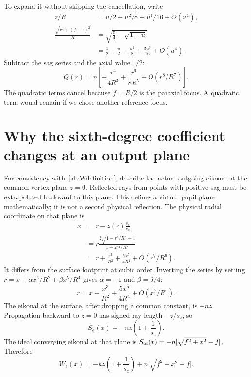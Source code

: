 To expand it without skipping the cancellation, write
\begin{align}
 z/R&=u/2+u^2/8+u^3/16+O(u^4),\\
 \frac{\sqrt{r^2+(f-z)^2}}{R}
 &=\sqrt{\frac54-\sqrt{1-u}}\\
 &=\frac12+\frac u2-\frac{u^2}{8}
                   +\frac{3u^3}{16}+O(u^4).
\end{align}
Subtract the sag series and the axial value $1/2$:
\begin{equation}
 \boxed{Q(r)=n\left[-\frac{r^4}{4R^3}
                    +\frac{r^6}{8R^5}+O(r^8/R^7)\right].}
 \label{ab:Qseries}
\end{equation}
The quadratic terms cancel because $f=R/2$ is the paraxial focus. A quadratic
term would remain if we chose another reference focus.

\section{Why the sixth-degree coefficient changes at an output plane}
For consistency with~\eqref{ab:Wdefinition}, describe the actual outgoing
eikonal at the common vertex plane $z=0$. Reflected rays from points with
positive sag must be extrapolated backward to this plane. This defines a
virtual pupil plane mathematically; it is not a second physical reflection.
The physical radial coordinate on that plane is
\begin{align}
 x&=r-z(r)\frac{s_r}{s_z}\\
  &=r\frac{2\sqrt{1-r^2/R^2}-1}{1-2r^2/R^2}\\
  &=r+\frac{r^3}{R^2}+\frac{7r^5}{4R^4}+O(r^7/R^6).
 \label{ab:spherepupilmap}
\end{align}
It differs from the surface footprint at cubic order. Inverting the series
by setting $r=x+\alpha x^3/R^2+\beta x^5/R^4$ gives
$\alpha=-1$ and $\beta=5/4$:
\begin{equation}
 r=x-\frac{x^3}{R^2}+\frac{5x^5}{4R^4}+O(x^7/R^6).
\end{equation}
The eikonal at the surface, after dropping a common constant, is $-nz$.
Propagation backward to $z=0$ has signed ray length $-z/s_z$, so
\begin{equation}
 S_e(x)=-nz\left(1+\frac{1}{s_z}\right).
\end{equation}
The ideal converging eikonal at that plane is
$S_{\rm id}(x)=-n[\sqrt{f^2+x^2}-f]$. Therefore
\begin{equation}
 W_e(x)=-nz\left(1+\frac1{s_z}\right)
          +n\bigl[\sqrt{f^2+x^2}-f\bigr].
\end{equation}
